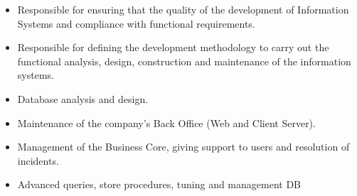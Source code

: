 \divider

\begin{itemize}
    \item Responsible for ensuring that the quality of the development of Information Systems and compliance with functional requirements.
    \item Responsible for defining the development methodology to carry out the functional analysis, design, construction and maintenance of the information systems.
    \item Database analysis and design.
    \item Maintenance of the company’s Back Office (Web and Client Server).
    \item Management of the Business Core, giving support to users and resolution of incidents.
    \item Advanced queries, store procedures, tuning and management DB
\end{itemize}
